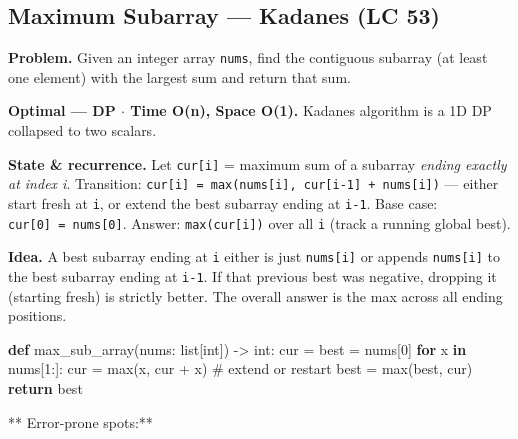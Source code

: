 \documentclass[11pt]{article}
\newenvironment{Shaded}{\begin{snugshade}}{\end{snugshade}}
\newcommand{\BuiltInTok}[1]{\textcolor[rgb]{0.50,0.55,0.55}{#1}}
\newcommand{\CommentTok}[1]{\textcolor[rgb]{0.48,0.49,0.49}{#1}}
\newcommand{\ControlFlowTok}[1]{\textcolor[rgb]{0.99,0.74,0.29}{\textbf{#1}}}
\newcommand{\DecValTok}[1]{\textcolor[rgb]{0.96,0.45,0.00}{#1}}
\newcommand{\KeywordTok}[1]{\textcolor[rgb]{0.81,0.81,0.76}{\textbf{#1}}}
\newcommand{\NormalTok}[1]{\textcolor[rgb]{0.81,0.81,0.76}{#1}}
\newcommand{\OperatorTok}[1]{\textcolor[rgb]{0.81,0.81,0.76}{#1}}
\begin{document}
\subsection{Maximum Subarray --- Kadane\textquotesingle s (LC 53)}\label{maximum-subarray--kadanes-lc-53}

\textbf{Problem.} Given an integer array \texttt{nums}, find the contiguous subarray (at least one element) with the largest sum and return that sum.

\textbf{Optimal --- DP \(\cdot\) Time O(n), Space O(1).} Kadane\textquotesingle s algorithm is a 1D DP collapsed to two scalars.

\textbf{State \& recurrence.} Let \texttt{cur{[}i{]}} = maximum sum of a subarray \emph{ending exactly at index i}. Transition: \texttt{cur{[}i{]}\ =\ max(nums{[}i{]},\ cur{[}i-1{]}\ +\ nums{[}i{]})} --- either start fresh at \texttt{i}, or extend the best subarray ending at \texttt{i-1}. Base case: \texttt{cur{[}0{]}\ =\ nums{[}0{]}}. Answer: \texttt{max(cur{[}i{]})} over all \texttt{i} (track a running global best).

\textbf{Idea.} A best subarray ending at \texttt{i} either is just \texttt{nums{[}i{]}} or appends \texttt{nums{[}i{]}} to the best subarray ending at \texttt{i-1}. If that previous best was negative, dropping it (starting fresh) is strictly better. The overall answer is the max across all ending positions.


\begin{Shaded}
\begin{Highlighting}[]
\KeywordTok{def}\NormalTok{ max\_sub\_array(nums: }\BuiltInTok{list}\NormalTok{[}\BuiltInTok{int}\NormalTok{]) }\OperatorTok{{-}\textgreater{}} \BuiltInTok{int}\NormalTok{:}
\NormalTok{    cur }\OperatorTok{=}\NormalTok{ best }\OperatorTok{=}\NormalTok{ nums[}\DecValTok{0}\NormalTok{]}
    \ControlFlowTok{for}\NormalTok{ x }\KeywordTok{in}\NormalTok{ nums[}\DecValTok{1}\NormalTok{:]:}
\NormalTok{        cur }\OperatorTok{=} \BuiltInTok{max}\NormalTok{(x, cur }\OperatorTok{+}\NormalTok{ x)      }\CommentTok{\# extend or restart}
\NormalTok{        best }\OperatorTok{=} \BuiltInTok{max}\NormalTok{(best, cur)}
    \ControlFlowTok{return}\NormalTok{ best}
\end{Highlighting}
\end{Shaded}

** Error-prone spots:**
\end{document}
